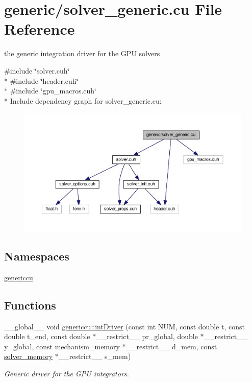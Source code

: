 \hypertarget{solver__generic_8cu}{}\section{generic/solver\+\_\+generic.cu File Reference}
\label{solver__generic_8cu}


the generic integration driver for the G\+PU solvers  


{\ttfamily \#include \char`\"{}solver.\+cuh\char`\"{}}\\*
{\ttfamily \#include \char`\"{}header.\+cuh\char`\"{}}\\*
{\ttfamily \#include \char`\"{}gpu\+\_\+macros.\+cuh\char`\"{}}\\*
Include dependency graph for solver\+\_\+generic.\+cu\+:\nopagebreak
\begin{figure}[H]
\begin{center}
\leavevmode
\includegraphics[width=350pt]{solver__generic_8cu__incl}
\end{center}
\end{figure}
\subsection*{Namespaces}
\begin{DoxyCompactItemize}
\item 
 \hyperlink{namespacegenericcu}{genericcu}
\end{DoxyCompactItemize}
\subsection*{Functions}
\begin{DoxyCompactItemize}
\item 
\+\_\+\+\_\+global\+\_\+\+\_\+ void \hyperlink{namespacegenericcu_aff46876594be0dced04cee0173535519}{genericcu\+::int\+Driver} (const int N\+UM, const double t, const double t\+\_\+end, const double $\ast$\+\_\+\+\_\+restrict\+\_\+\+\_\+ pr\+\_\+global, double $\ast$\+\_\+\+\_\+restrict\+\_\+\+\_\+ y\+\_\+global, const mechanism\+\_\+memory $\ast$\+\_\+\+\_\+restrict\+\_\+\+\_\+ d\+\_\+mem, const \hyperlink{structsolver__memory}{solver\+\_\+memory} $\ast$\+\_\+\+\_\+restrict\+\_\+\+\_\+ s\+\_\+mem)
\begin{DoxyCompactList}\small\item\em Generic driver for the G\+PU integrators. \end{DoxyCompactList}\end{DoxyCompactItemize}


